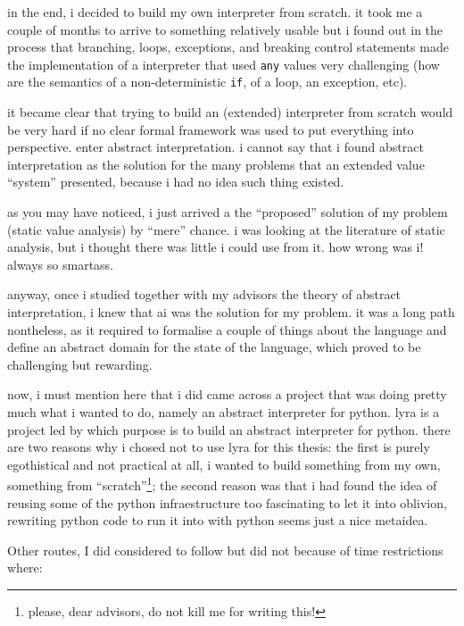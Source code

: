 {}

in the end, i decided to build my own interpreter from scratch. it took
me a couple of months to arrive to something relatively usable but i
found out in the process that branching, loops, exceptions, and breaking
control statements made the implementation of a interpreter that used
\texttt{any} values very challenging (how are the semantics of a
non-deterministic \texttt{if}, of a loop, an exception, etc).

it became clear that trying to build an (extended) interpreter from
scratch would be very hard if no clear formal framework was used to put
everything into perspective. enter abstract interpretation. i cannot say
that i found abstract interpretation as the solution for the many
problems that an extended value \enquote{system} presented, because i
had no idea such thing existed.

as you may have noticed, i just arrived a the \enquote{proposed}
solution of my problem (static value analysis) by \enquote{mere} chance.
i was looking at the literature of static analysis, but i thought there
was little i could use from it. how wrong was i! always so
smartass{}.

anyway, once i studied together with my advisors the theory of abstract
interpretation, i knew that ai was the solution for my problem. it was a
long path nontheless, as it required to formalise a couple of things
about the language and define an abstract domain for the state of the
language, which proved to be challenging but rewarding.

now, i must mention here that i did came across a project that was doing
pretty much what i wanted to do, namely an abstract interpreter for
python. {} lyra is a project led by {} which purpose is to build an abstract interpreter for python. there
are two reasons why i chosed not to use lyra for this thesis: the first
is purely egothistical and not practical at all, i wanted to build
something from my own, something from \enquote{scratch}\footnote{please,
  dear advisors, do not kill me for writing this!}; the second reason
was that i had found the idea of reusing some of the python
infraestructure too fascinating to let it into oblivion, rewriting
python code to run it into with python seems just a nice metaidea.

{}

Other routes, I did considered to follow but did not because of time
restrictions where:

